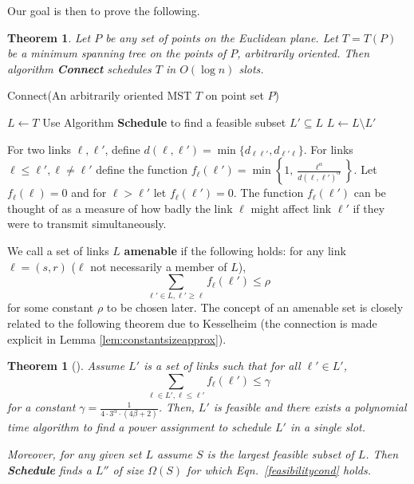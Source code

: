 \documentclass[11pt]{amsart}
\newcommand{\amenable}{amenable}
\newcounter{foo}
\newtheorem{theorem}[foo]{Theorem}
\begin{document}
Our goal is then to prove the following.
\begin{theorem}
Let $P$ be any set of points on the Euclidean plane. Let $T = T(P)$ be a minimum spanning tree on the points of $P$,
arbitrarily oriented. Then algorithm {\bf Connect} schedules $T$ in $O(\log n)$ slots.
\label{mainth1}
\end{theorem}

\begin{algorithm}                      \caption{Connect(An arbitrarily oriented MST $T$ on point set $P$)}          \label{alg1}                           \begin{algorithmic}[1]                    \STATE $L \gets T$
     	\STATE Use Algorithm \textbf{Schedule} to find a feasible subset $L' \subseteq L$ \label{alg:findfeasibleset}
	\STATE $L \gets L \setminus L'$
     \ENDWHILE
\end{algorithmic}
\label{alg1fig}
\end{algorithm}

For two links $\ell, \ell'$, define $d(\ell, \ell') = \min\{d_{\ell \ell'}, d_{\ell' \ell}\}$. For links $\ell \leq \ell', \ell \neq \ell'$ define
the function $f_\ell(\ell') = \min\left\{1, \frac{\ell^{\alpha}}{d(\ell, \ell')^{\alpha}}\right\}$. Let $f_{\ell}(\ell) = 0$ and for $\ell > \ell'$
let $f_{\ell}(\ell') = 0$. The function $f_{\ell}(\ell')$ can be thought of as a measure of how badly the link $\ell$ might affect link $\ell'$ if
they were to transmit simultaneously.

We call a set of links $L$ \textbf{\amenable} if the following holds:
for any link $\ell = (s, r)$ ($\ell$ not necessarily a member of $L$), 
\begin{equation}
\sum_{\ell' \in L, \ell' \geq \ell} f_{\ell}(\ell') \leq \rho
\end{equation}
for some constant $\rho$ to be chosen later. The concept of an amenable set is closely related to the following
theorem due to Kesselheim (the connection is made explicit in Lemma \ref{lem:constantsizeapprox}).

\begin{theorem}[\cite{KesselheimSoda11}]
Assume $L'$ is a set of links such that for all $\ell' \in L'$,
\begin{equation}
\sum_{\ell \in L', \ell \leq \ell'} f_{\ell}(\ell') \leq \gamma
\label{feasibilitycond}
\end{equation}
for a constant $\gamma = \frac{1}{4 \cdot 3^{\alpha} \cdot (4 \beta + 2)}$.
Then, $L'$ is feasible and there exists a polynomial time algorithm to find a power assignment to schedule $L'$ in a single slot.

Moreover, for any given set $L$ assume $S$ is the largest feasible subset of $L$. Then \textbf{Schedule} finds a $L''$ of size $\Omega(S)$ for which Eqn.~\ref{feasibilitycond} holds.
\label{kessel}
\end{theorem}
\end{document}

